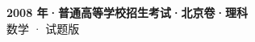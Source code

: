 \documentclass[zihao=-4, a4paper]{ctexart}
\begin{document}
\begin{center}
  {\Large\bfseries 2008 年·普通高等学校招生考试·北京卷·理科}\\[4pt]
  {\large 数学 · 试题版}
\end{center}
\medskip
{}

\end{document}
